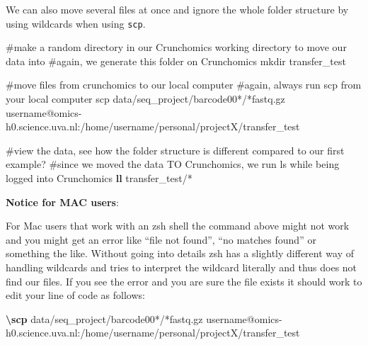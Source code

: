 \documentclass[
  letterpaper,
  DIV=11,
  numbers=noendperiod]{scrreprt}
\newenvironment{Shaded}{}{}
\newcommand{\CommentTok}[1]{\textcolor[rgb]{0.42,0.45,0.49}{#1}}
\newcommand{\ExtensionTok}[1]{\textcolor[rgb]{0.84,0.23,0.29}{\textbf{#1}}}
\newcommand{\FunctionTok}[1]{\textcolor[rgb]{0.44,0.26,0.76}{#1}}
\newcommand{\NormalTok}[1]{\textcolor[rgb]{0.14,0.16,0.18}{#1}}
\newcommand{\PreprocessorTok}[1]{\textcolor[rgb]{0.84,0.23,0.29}{#1}}
\begin{document}
\begin{tcolorbox}[enhanced jigsaw, colframe=quarto-callout-tip-color-frame, breakable, opacityback=0, toptitle=1mm, left=2mm, coltitle=black, colbacktitle=quarto-callout-tip-color!10!white, title=\textcolor{quarto-callout-tip-color}{\faLightbulb}\hspace{0.5em}{Tip: Moving data from the HPC using wildcards}, rightrule=.15mm, bottomtitle=1mm, titlerule=0mm, colback=white, arc=.35mm, toprule=.15mm, bottomrule=.15mm, leftrule=.75mm, opacitybacktitle=0.6]

We can also move several files at once and ignore the whole folder
structure by using wildcards when using \texttt{scp}.

\begin{Shaded}
\begin{Highlighting}[]
\CommentTok{\#make a random directory in our Crunchomics working directory to move our data into}
\CommentTok{\#again, we generate this folder on Crunchomics}
\FunctionTok{mkdir}\NormalTok{ transfer\_test}

\CommentTok{\#move files from crunchomics to our local computer}
\CommentTok{\#again, always run scp from your local computer}
\FunctionTok{scp}\NormalTok{ data/seq\_project/barcode00}\PreprocessorTok{*}\NormalTok{/}\PreprocessorTok{*}\NormalTok{fastq.gz username@omics{-}h0.science.uva.nl:/home/username/personal/projectX/transfer\_test}

\CommentTok{\#view the data, see how the folder structure is different compared to our first example? }
\CommentTok{\#since we moved the data TO Crunchomics, we run ls while being logged into Crunchomics}
\ExtensionTok{ll}\NormalTok{ transfer\_test/}\PreprocessorTok{*}
\end{Highlighting}
\end{Shaded}

\textbf{Notice for MAC users}:

For Mac users that work with an zsh shell the command above might not
work and you might get an error like ``file not found'', ``no matches
found'' or something the like. Without going into details zsh has a
slightly different way of handling wildcards and tries to interpret the
wildcard literally and thus does not find our files. If you see the
error and you are sure the file exists it should work to edit your line
of code as follows:

\begin{Shaded}
\begin{Highlighting}[]
\ExtensionTok{\textbackslash{}scp}\NormalTok{  data/seq\_project/barcode00}\PreprocessorTok{*}\NormalTok{/}\PreprocessorTok{*}\NormalTok{fastq.gz username@omics{-}h0.science.uva.nl:/home/username/personal/projectX/transfer\_test}
\end{Highlighting}
\end{Shaded}


\end{tcolorbox}
\end{document}
